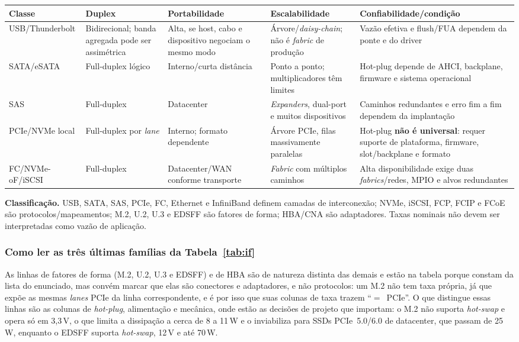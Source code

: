 \documentclass[11pt,a4paper]{article}
\begin{document}
\begin{center}\footnotesize
\begin{tabular}{@{}p{2.7cm}p{2.3cm}p{3.0cm}p{3.0cm}p{4.0cm}@{}}
\toprule
\textbf{Classe} & \textbf{Duplex} & \textbf{Portabilidade} & \textbf{Escalabilidade} & \textbf{Confiabilidade/condição} \\
\midrule
USB/Thunderbolt & Bidirecional; banda agregada pode ser assimétrica & Alta, se host, cabo e dispositivo negociam o mesmo modo & Árvore/\emph{daisy-chain}; não é \emph{fabric} de produção & Vazão efetiva e flush/FUA dependem da ponte e do driver \\
SATA/eSATA & Full-duplex lógico & Interno/curta distância & Ponto a ponto; multiplicadores têm limites & Hot-plug depende de AHCI, backplane, firmware e sistema operacional \\
SAS & Full-duplex & Datacenter & \emph{Expanders}, dual-port e muitos dispositivos & Caminhos redundantes e erro fim a fim dependem da implantação \\
PCIe/NVMe local & Full-duplex por \emph{lane} & Interno; formato dependente & Árvore PCIe, filas massivamente paralelas & Hot-plug \textbf{não é universal}: requer suporte de plataforma, firmware, slot/backplane e formato \\
FC/NVMe-oF/iSCSI & Full-duplex & Datacenter/WAN conforme transporte & \emph{Fabric} com múltiplos caminhos & Alta disponibilidade exige duas \emph{fabrics}/redes, MPIO e alvos redundantes \\
\bottomrule
\end{tabular}
\end{center}

\noindent\textbf{Classificação.} USB, SATA, SAS, PCIe, FC, Ethernet e InfiniBand definem
camadas de interconexão; NVMe, iSCSI, FCP, FCIP e FCoE são protocolos/mapeamentos; M.2, U.2,
U.3 e EDSFF são fatores de forma; HBA/CNA são adaptadores. Taxas nominais não devem ser
interpretadas como vazão de aplicação.

\subsubsection*{Como ler as três últimas famílias da Tabela~\ref{tab:if}}

As linhas de fatores de forma (M.2, U.2, U.3 e EDSFF) e de HBA são de natureza distinta das
demais e estão na tabela porque constam da lista do enunciado, mas convém marcar que elas são
conectores e adaptadores, e não protocolos: um M.2 não tem taxa própria, já que expõe as mesmas
\textit{lanes} PCIe da linha correspondente, e é por isso que suas colunas de taxa trazem
``$=$~PCIe''. O que distingue essas linhas são as colunas de \textit{hot-plug}, alimentação e
mecânica, onde estão as decisões de projeto que importam: o M.2 não suporta \textit{hot-swap} e opera
só em 3,3\,V, o que limita a dissipação a cerca de 8 a 11\,W e o inviabiliza para SSDs PCIe~5.0/6.0
de datacenter, que passam de 25\,W, enquanto o EDSFF suporta \textit{hot-swap}, 12\,V e até 70\,W.
\end{document}
